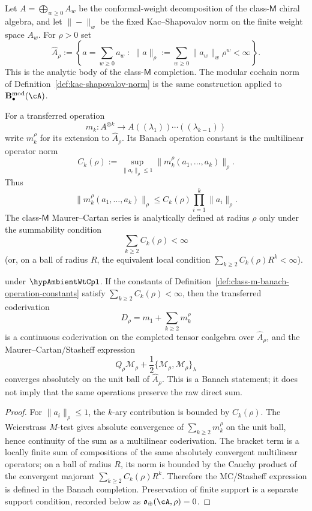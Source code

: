 \begin{definition}
\label{def:class-m-banach-algebra-body}
Let \(A=\bigoplus_{w\ge0}A_w\) be the conformal-weight decomposition
of the class-\(\mathsf M\) chiral algebra, and let
\(\|- \|_{w}\) be the fixed Kac--Shapovalov norm on the finite
weight space \(A_w\).  For \(\rho>0\) set
\[
 \widehat A_{\rho}
 :=
 \left\{
 a=\sum_{w\ge0}a_w\;:\;
 \|a\|_{\rho}:=
 \sum_{w\ge0}\|a_w\|_{w}\rho^w<\infty
 \right\}.
\]
This is the analytic body of the class-\(\mathsf M\) completion.  The
modular cochain norm of Definition~\ref{def:kac-shapovalov-norm} is
the same construction applied to
\(\mathbf B^{\mathrm{mod}}_\bullet(\cA)\).
\end{definition}

\begin{definition}
\label{def:class-m-banach-operation-constants}
For a transferred operation
\[
m_k\colon A^{\otimes k}\longrightarrow A((\lambda_1))\cdots
((\lambda_{k-1}))
\]
write \(m_k^\rho\) for its extension to
\(\widehat A_\rho\).  Its Banach operation constant is the multilinear
operator norm
\[
C_k(\rho)
:=
\sup_{\|a_i\|_\rho\le1}
\|m_k^\rho(a_1,\ldots,a_k)\|_\rho.
\]
Thus
\[
\|m_k^\rho(a_1,\ldots,a_k)\|_\rho
\le
C_k(\rho)\prod_{i=1}^k\|a_i\|_\rho .
\]
The class-\(\mathsf M\) Maurer--Cartan series is analytically
defined at radius \(\rho\) only under the summability condition
\[
\sum_{k\ge2}C_k(\rho)<\infty
\]
(or, on a ball of radius \(R\), the equivalent local condition
\(\sum_{k\ge2}C_k(\rho)R^k<\infty\)).
\end{definition}

\begin{proposition}
\label{prop:class-m-banach-mc-convergence}
\ClaimStatusProvedHere{} under \(\hypAmbientWtCpl\).
If the constants of
Definition~\ref{def:class-m-banach-operation-constants} satisfy
\(\sum_{k\ge2}C_k(\rho)<\infty\), then the transferred coderivation
\[
D_\rho=m_1+\sum_{k\ge2}m_k^\rho
\]
is a continuous coderivation on the completed tensor coalgebra over
\(\widehat A_\rho\), and the Maurer--Cartan/Stasheff expression
\[
Q_\rho\mathcal M_\rho+\frac12\{\mathcal M_\rho,\mathcal M_\rho\}_\lambda
\]
converges absolutely on the unit ball of \(\widehat A_\rho\).  This is
a Banach statement; it does not imply that the same operations preserve
the raw direct sum.
\end{proposition}

\begin{proof}
For \(\|a_i\|_\rho\le1\), the \(k\)-ary contribution is bounded by
\(C_k(\rho)\).  The Weierstrass \(M\)-test gives absolute convergence
of \(\sum_{k\ge2}m_k^\rho\) on the unit ball, hence continuity of the
sum as a multilinear coderivation.  The bracket term is a locally
finite sum of compositions of the same absolutely convergent
multilinear operators; on a ball of radius \(R\), its norm is bounded
by the Cauchy product of the convergent majorant
\(\sum_{k\ge2}C_k(\rho)R^k\).  Therefore the MC/Stasheff expression is
defined in the Banach completion.  Preservation of finite support is a
separate support condition, recorded below as
\(\mathfrak o_\oplus(\cA,\rho)=0\).
\end{proof}

